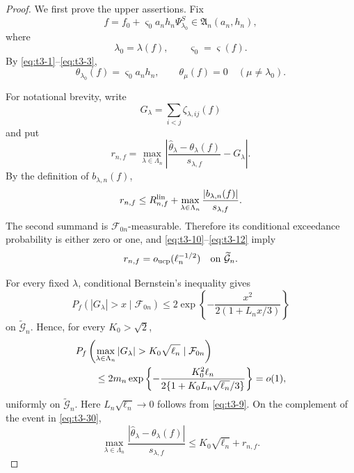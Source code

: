 \documentclass[11pt]{article}
\theoremstyle{definition}
\newcommand{\1}{\mathbf 1}\newcommand{\op}{\operatorname}
\begin{document}
\begin{proof}
We first prove the upper assertions.  Fix
\[
f
=
f_0+\varsigma_0a_n h_n\Psi_{\lambda_0}^S
\in\mathfrak A_n(a_n,h_n),
\]
where
\[
\lambda_0=\lambda(f),
\qquad
\varsigma_0=\varsigma(f).
\]
By \eqref{eq:t3-1}--\eqref{eq:t3-3},
\begin{equation}
\theta_{\lambda_0}(f)
=
\varsigma_0a_n h_n,
\qquad
\theta_\mu(f)=0
\quad(\mu\ne\lambda_0).
\label{eq:t3-28}
\end{equation}

For notational brevity, write
\[
G_\lambda
=
\sum_{i<j}\zeta_{\lambda,ij}(f)
\]
and put
\[
r_{n,f}
=
\max_{\lambda\in\Lambda_n}
\left|
\frac{\widehat\theta_\lambda-\theta_\lambda(f)}
{s_{\lambda,f}}
-
G_\lambda
\right|.
\]
By the definition of \(b_{\lambda,n}(f)\),
\[
r_{n,f}
\le
R_{n,f}^{\rm lin}
+
\max_{\lambda\in\Lambda_n}
\frac{|b_{\lambda,n}(f)|}{s_{\lambda,f}}.
\]
The second summand is \(\mathcal F_{0n}\)-measurable.  Therefore its
conditional exceedance probability is either zero or one, and
\eqref{eq:t3-10}--\eqref{eq:t3-12} imply
\begin{equation}
r_{n,f}
=
o_{\rm ucp}(\ell_n^{-1/2})
\quad
\text{on }\widetilde{\mathcal G}_n.
\label{eq:t3-29}
\end{equation}

For every fixed \(\lambda\), conditional Bernstein's inequality gives
\[
P_f\left(
|G_\lambda|>x
\mid\mathcal F_{0n}
\right)
\le
2\exp\left\{
-\frac{x^2}{2(1+L_nx/3)}
\right\}
\]
on \(\widetilde{\mathcal G}_n\).  Hence, for every
\(K_0>\sqrt2\),
\begin{align}
&P_f\left(
\max_{\lambda\in\Lambda_n}|G_\lambda|
>
K_0\sqrt{\ell_n}
\mid\mathcal F_{0n}
\right)
\notag\\
&\qquad\le
2m_n
\exp\left\{
-\frac{K_0^2\ell_n}
{2\{1+K_0L_n\sqrt{\ell_n}/3\}}
\right\}
=o(1),
\label{eq:t3-30}
\end{align}
uniformly on \(\widetilde{\mathcal G}_n\).  Here
\(L_n\sqrt{\ell_n}\to0\) follows from \eqref{eq:t3-9}.  On the
complement of the event in \eqref{eq:t3-30},
\begin{equation}
\max_{\lambda\in\Lambda_n}
\frac{
|\widehat\theta_\lambda-\theta_\lambda(f)|
}{
s_{\lambda,f}
}
\le
K_0\sqrt{\ell_n}+r_{n,f}.
\label{eq:t3-31}
\end{equation}


\end{proof}
\end{document}
